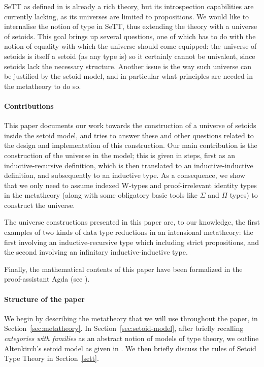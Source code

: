 \documentclass{easychair}
\begin{document}
SeTT as defined in \cite{mpc19} is already a rich theory, but its introspection
capabilities are currently lacking, as its universes are limited to
propositions. We would like to internalise the notion of type in SeTT, thus
extending the theory with a universe of setoids.
%
This goal brings up several questions, one of which has to do with the notion of
equality with which the universe should come equipped: the universe of setoids
is itself a setoid (as any type is) so it certainly cannot be univalent, since
setoids lack the necessary structure.
%
Another issue is the way such universe can be justified by the setoid model, and
in particular what principles are needed in the metatheory to do so.

\paragraph{Contributions}

This paper documents our work towards the construction of a universe of setoids
inside the setoid model, and tries to answer these and other questions related
to the design and implementation of this construction. Our main contribution is
the construction of the universe in the model; this is given in steps, first as
an inductive-recursive definition, which is then translated to an
inductive-inductive definition, and subsequently to an inductive type. As a
consequence, we show that we only need to assume indexed W-types and
proof-irrelevant identity types in the metatheory (along with some obligatory
basic tools like $\Sigma$ and $\Pi$ types) to construct the universe.

The universe constructions presented in this paper are, to our knowledge, the
first examples of two kinds of data type reductions in an intensional
metatheory: the first involving an inductive-recursive type which including
strict propositions, and the second involving an infinitary inductive-inductive
type.

Finally, the mathematical contents of this paper have been formalized in the
proof-assistant Agda (see \cite{agda-code}).

\paragraph{Structure of the paper}

We begin by describing the metatheory that we will use throughout the paper, in
Section~\ref{sec:metatheory}. In Section~\ref{sec:setoid-model}, after briefly
recalling \emph{categories with families} as an abstract notion of models of
type theory, we outline Altenkirch's setoid model as given in \cite{mpc19}. We
then briefly discuss the rules of Setoid Type Theory in Section~\ref{sett}.
\end{document}
